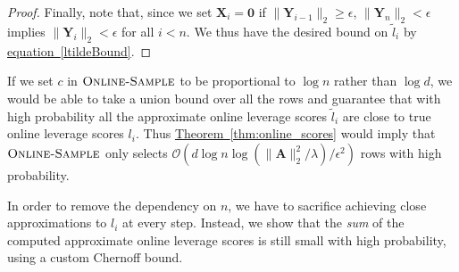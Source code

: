 \documentclass[11pt]{article}
\numberwithin{equation}{section}
\theoremstyle{definition}
\theoremstyle{plain}
\newcommand{\expref}[2]{\hyperref[#2]{#1~\ref{#2}}}
\newcommand{\expeqref}[2]{\hyperref[#2]{#1~\eqref{#2}}}
\newcommand{\Oh}{\ensuremath{\mathcal{O}}}
\newcommand{\bv}[1]{\mathbf{#1}}
\newcommand{\norm}[1]{\|#1\|}
\begin{document}
\begin{proof}
Finally, note that, since we set $\bv{X}_i = \bv{0}$ if $\norm{\bv{Y}_{i-1}}_2 \ge \epsilon$, $\norm{\bv{Y}_n}_2 < \epsilon$ implies $\norm{\bv{Y}_i}_2 < \epsilon$ for all $i < n$. We thus have the desired bound on $\tilde{l}_i$ by \expeqref{equation}{ltildeBound}.
\end{proof}

If we set $c$ in $\textsc{Online-Sample}$ to be proportional to $\log n$ rather than $\log d$, we would be able to take a union bound over all the rows and guarantee that with high probability all the approximate online leverage scores $\tilde{l}_i$ are close to true online leverage scores $l_i$.
Thus \expref{Theorem}{thm:online_scores} would imply that $\textsc{Online-Sample}$ only selects  $\Oh(d\log n \log(\|\bv{A}\|_2^2 / \lambda)/\epsilon^2)$ rows with high probability.

In order to remove the dependency on $n$, we have to sacrifice achieving close approximations to $l_i$ at every step.
Instead, we show that the \emph{sum} of the computed approximate online leverage scores is still small with high probability, using a custom Chernoff bound.
\end{document}
